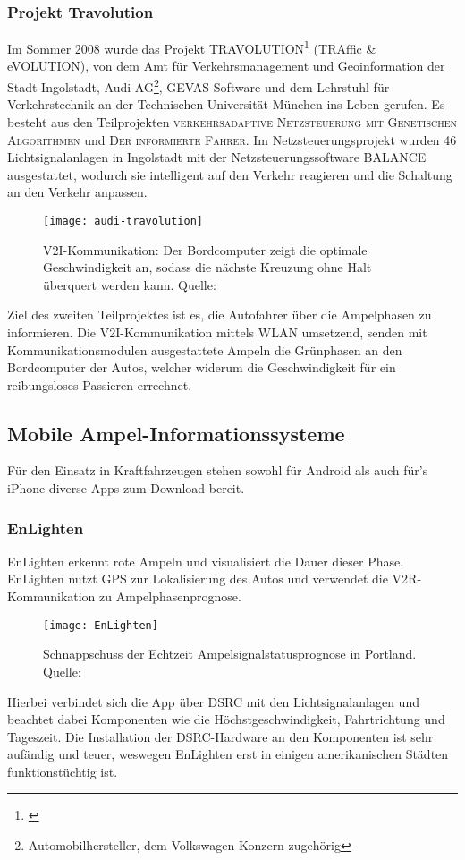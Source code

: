 \subsubsection{Projekt Travolution}
Im Sommer 2008 wurde das Projekt TRAVOLUTION\footnote{\cite{Travolution}} (TRAffic \& eVOLUTION), von dem Amt für Verkehrsmanagement und Geoinformation der Stadt Ingolstadt, Audi AG\footnote{Automobilhersteller, dem Volkswagen-Konzern zugehörig}, GEVAS Software und dem Lehrstuhl für Verkehrstechnik an der Technischen Universität München ins Leben gerufen. Es besteht aus den Teilprojekten \textsc{verkehrsadaptive Netzsteuerung mit Genetischen Algorithmen} und \textsc{Der informierte Fahrer}. Im Netzsteuerungsprojekt wurden 46 Lichtsignalanlagen in Ingolstadt mit der Netzsteuerungssoftware BALANCE ausgestattet, wodurch sie intelligent auf den Verkehr reagieren und die Schaltung an den Verkehr anpassen. 
\begin{figure}[H]  
    \centering  
    \texttt{[image: audi-travolution]}
    \label{fig:travolution}
    \caption[Travolutions]{\gls{V2I}-Kommunikation: Der Bordcomputer zeigt die optimale Geschwindigkeit an, sodass die nächste Kreuzung ohne Halt überquert werden kann. Quelle: \cite{AudiTravolution}}
\end{figure}
Ziel des zweiten Teilprojektes ist es, die Autofahrer über die Ampelphasen zu informieren. Die \gls{V2I}-Kommunikation mittels WLAN umsetzend, senden mit Kommunikationsmodulen ausgestattete Ampeln die Grünphasen an den Bordcomputer der Autos, welcher widerum die Geschwindigkeit für ein reibungsloses Passieren errechnet.
\subsection{Mobile Ampel-Informationssysteme}
Für den Einsatz in Kraftfahrzeugen stehen sowohl für Android als auch für's iPhone diverse Apps zum Download bereit. 
\subsubsection{EnLighten}
EnLighten erkennt rote Ampeln und visualisiert die Dauer dieser Phase.  
EnLighten nutzt \gls{GPS} zur Lokalisierung des Autos und verwendet die \gls{V2R}-Kommunikation zu Ampelphasenprognose.
\begin{figure}[H]
    \centering
    \texttt{[image: EnLighten]}
    \label{fig:Ampelsignalstatus}
    \caption[Echtzeit Ampelsignalstatus]{Schnappschuss der Echtzeit Ampelsignalstatusprognose in Portland. Quelle: \cite{EnLighten}}
\end{figure}
Hierbei verbindet sich die App über \gls{DSRC} mit den Lichtsignalanlagen und beachtet dabei Komponenten wie die Höchstgeschwindigkeit, Fahrtrichtung und Tageszeit.
Die Installation der \gls{DSRC}-Hardware an den Komponenten ist sehr aufändig und teuer, weswegen EnLighten erst in einigen amerikanischen Städten funktionstüchtig ist.
